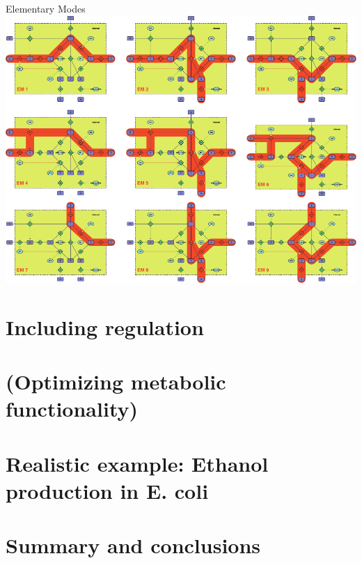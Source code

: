 \documentclass{beamer}
\begin{document}
\begin{frame}{Elementary Modes}
    \includegraphics[width=.9\textwidth]{grafik/fig2} \\
\end{frame}
\section{Including regulation}


\section{(Optimizing metabolic functionality)}


\section{Realistic example: Ethanol production in E. coli}

\section{Summary and conclusions}
\end{document}
